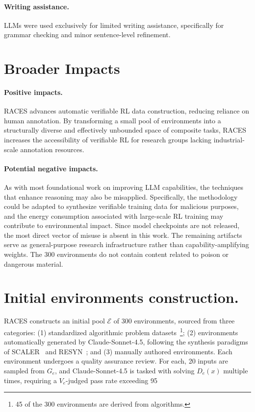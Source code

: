 \paragraph{Writing assistance.} LLMs were used exclusively for limited writing assistance, specifically for grammar checking and minor sentence-level refinement.

\section{Broader Impacts}
\label{sec:broader_impacts}

\paragraph{Positive impacts.} RACES advances automatic verifiable RL data construction, reducing reliance on human annotation. By transforming a small pool of environments into a structurally diverse and effectively unbounded space of composite tasks, RACES increases the accessibility of verifiable RL for research groups lacking industrial-scale annotation resources.

\paragraph{Potential negative impacts.} As with most foundational work on improving LLM capabilities, the techniques that enhance reasoning may also be misapplied. Specifically, the methodology could be adapted to synthesize verifiable training data for malicious purposes, and the energy consumption associated with large-scale RL training may contribute to environmental impact. Since model checkpoints are not released, the most direct vector of misuse is absent in this work. The remaining artifacts serve as general-purpose research infrastructure rather than capability-amplifying weights. The 300 environments do not contain content related to poison or dangerous material.

\section{Initial environments construction.}
\label{init_envs}
RACES constructs an initial pool $\mathcal{E}$ of 300 environments, sourced from three categories: (1) standardized algorithmic problem datasets~\citep{xia2025leetcodedatasettemporaldatasetrobust}\footnote{45 of the 300 environments are derived from algorithms.}; (2) environments automatically generated by Claude-Sonnet-4.5, following the synthesis paradigms of SCALER~\citep{xu2026scalersyntheticscalableadaptivelearning} and RESYN~\citep{he2026resyn}; and (3) manually authored environments.
Each environment undergoes a quality assurance review. For each, 20 inputs are sampled from $G_e$, and Claude-Sonnet-4.5 is tasked with solving $D_e(x)$ multiple times, requiring a $V_e$-judged pass rate exceeding 95%
\label{app:quality}

